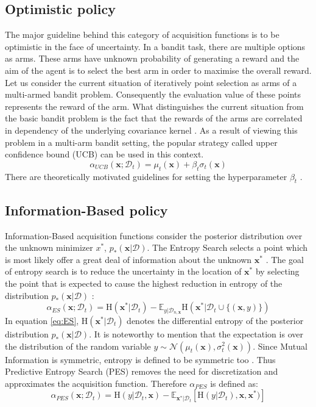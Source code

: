 \subsection{Optimistic policy}
The major guideline behind this category of acquisition functions is to be optimistic in the face of uncertainty. In a bandit task, there are multiple options as arms. These arms have unknown probability of generating a reward and the aim of the agent is to select the best arm in order to maximise the overall reward. Let us consider the current situation of iteratively point selection as arms of a multi-armed bandit problem. Consequently the evaluation value of these points represents the reward of the arm. What distinguishes the current situation from the basic bandit problem is the fact that the rewards of the arms are correlated in dependency of the underlying covariance kernel \cite{schulz2017tutorial}. As a result of viewing this problem in a multi-arm bandit setting, the popular strategy called upper confidence bound (UCB) can be used in this context.
\begin{equation}
\alpha_{UCB}(\textbf{x};\mathcal{D}_t) = \mu_t(\textbf{x}) + \beta_t \sigma_t(\textbf{x})
\end{equation}
There are theoretically motivated guidelines for setting the hyperparameter $\beta_t$ \cite{srinivas2009gaussian}.

\subsection{Information-Based policy}
Information-Based acquisition functions consider the posterior distribution over the unknown minimizer $x^*$, $p_*(\textbf{x}|\mathcal{D})$. The Entropy Search selects a point which is most likely offer a great deal of information about the unknown $\textbf{x}^*$ \cite{hernandez2015predictive}. The goal of entropy search  is to reduce the uncertainty in the location of $\textbf{x}^*$ by selecting the point that is expected to cause the highest reduction in entropy of the distribution  $p_*(\textbf{x}|\mathcal{D})$ \cite{shahriari2016taking}:
\begin{equation}
\alpha_{ES}(\textbf{x};\mathcal{D}_t) =  \mathrm{H}(\textbf{x}^*|\mathcal{D}_t) - \mathbb{E}_{y|\mathcal{D}_{n,\textbf{x}}} \mathrm{H}(\textbf{x}^*|\mathcal{D}_t \cup \{(\textbf{x},y)\})
\label{eq:ES}
\end{equation}
In equation \ref{eq:ES}, $\mathrm{H}(\textbf{x}^*|\mathcal{D}_t)$ denotes the differential entropy of the posterior distribution  $p_*(\textbf{x}|\mathcal{D})$. It is noteworthy to mention that the expectation is over the distribution of the random variable $y \sim \mathcal{N} (\mu_t(\textbf{x}),\sigma_{t}^{2}(\textbf{x}))$. Since Mutual Information is symmetric, entropy is defined to be symmetric too \cite{hernandez2015predictive}. Thus Predictive Entropy Search (PES) removes the need for discretization and approximates the acquisition function. Therefore $\alpha_{PES}$ is defined as:
\begin{equation}
\alpha_{PES}(\textbf{x};\mathcal{D}_t) = \mathrm{H}(y|\mathcal{D}_t,\textbf{x}) - \mathbb{E}_{\textbf{x}^*|\mathcal{D}_t} [\mathrm{H}(y|\mathcal{D}_t),\textbf{x},\textbf{x}^*)]
\label{eq:PES}
\end{equation}
